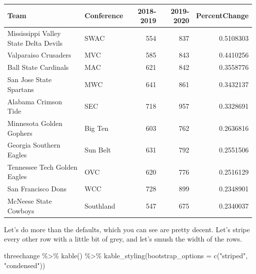 \documentclass[
]{book}
\newenvironment{Shaded}{\begin{snugshade}}{\end{snugshade}}
\newcommand{\AttributeTok}[1]{\textcolor[rgb]{0.77,0.63,0.00}{#1}}
\newcommand{\FunctionTok}[1]{\textcolor[rgb]{0.00,0.00,0.00}{#1}}
\newcommand{\NormalTok}[1]{#1}
\newcommand{\SpecialCharTok}[1]{\textcolor[rgb]{0.00,0.00,0.00}{#1}}
\newcommand{\StringTok}[1]{\textcolor[rgb]{0.31,0.60,0.02}{#1}}
\begin{document}
\begin{table}[H]
\centering
\begin{tabular}{l|l|r|r|r}
\hline
Team & Conference & 2018-2019 & 2019-2020 & PercentChange\\
\hline
Mississippi Valley State Delta Devils & SWAC & 554 & 837 & 0.5108303\\
\hline
Valparaiso Crusaders & MVC & 585 & 843 & 0.4410256\\
\hline
Ball State Cardinals & MAC & 621 & 842 & 0.3558776\\
\hline
San Jose State Spartans & MWC & 641 & 861 & 0.3432137\\
\hline
Alabama Crimson Tide & SEC & 718 & 957 & 0.3328691\\
\hline
Minnesota Golden Gophers & Big Ten & 603 & 762 & 0.2636816\\
\hline
Georgia Southern Eagles & Sun Belt & 631 & 792 & 0.2551506\\
\hline
Tennessee Tech Golden Eagles & OVC & 620 & 776 & 0.2516129\\
\hline
San Francisco Dons & WCC & 728 & 899 & 0.2348901\\
\hline
McNeese State Cowboys & Southland & 547 & 675 & 0.2340037\\
\hline
\end{tabular}
\end{table}

Let's do more than the defaults, which you can see are pretty decent. Let's stripe every other row with a little bit of grey, and let's smush the width of the rows.

\begin{Shaded}
\begin{Highlighting}[]
\NormalTok{threechange }\SpecialCharTok{\%\textgreater{}\%} 
  \FunctionTok{kable}\NormalTok{() }\SpecialCharTok{\%\textgreater{}\%} 
  \FunctionTok{kable\_styling}\NormalTok{(}\AttributeTok{bootstrap\_options =} \FunctionTok{c}\NormalTok{(}\StringTok{"striped"}\NormalTok{, }\StringTok{"condensed"}\NormalTok{))}
\end{Highlighting}
\end{Shaded}
\end{document}

